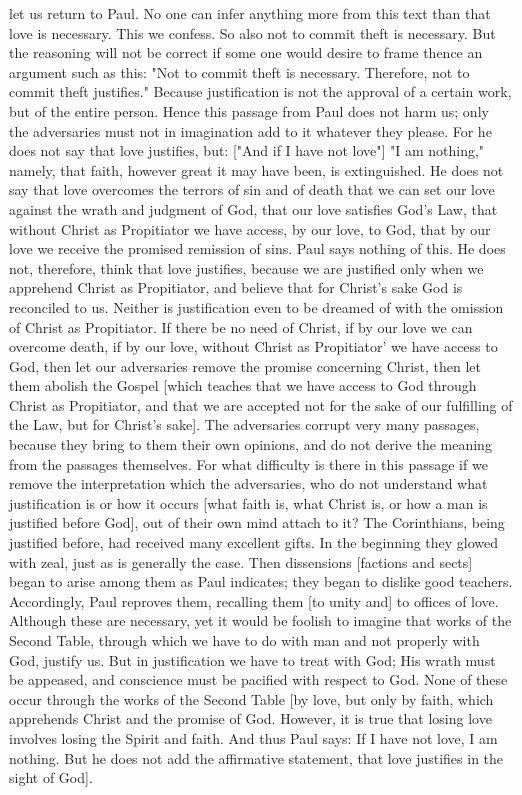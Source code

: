 let us return to Paul.  No one can infer anything more from this text
than that love is necessary.  This we confess.  So also not to commit
theft is necessary.  But the reasoning will not be correct if some
one would desire to frame thence an argument such as this: "Not to
commit theft is necessary.  Therefore, not to commit theft justifies."
Because justification is not the approval of a certain work, but of
the entire person.  Hence this passage from Paul does not harm us;
only the adversaries must not in imagination add to it whatever they
please.  For he does not say that love justifies, but: ["And if I
have not love"] "I am nothing," namely, that faith, however great it
may have been, is extinguished.  He does not say that love overcomes
the terrors of sin and of death that we can set our love against the
wrath and judgment of God, that our love satisfies God's Law, that
without Christ as Propitiator we have access, by our love, to God,
that by our love we receive the promised remission of sins.  Paul
says nothing of this.  He does not, therefore, think that love
justifies, because we are justified only when we apprehend Christ as
Propitiator, and believe that for Christ's sake God is reconciled to
us.  Neither is justification even to be dreamed of with the omission
of Christ as Propitiator.  If there be no need of Christ, if by our
love we can overcome death, if by our love, without Christ as
Propitiator' we have access to God, then let our adversaries remove
the promise concerning Christ, then let them abolish the Gospel
[which teaches that we have access to God through Christ as
Propitiator, and that we are accepted not for the sake of our
fulfilling of the Law, but for Christ's sake].  The adversaries
corrupt very many passages, because they bring to them their own
opinions, and do not derive the meaning from the passages themselves.
For what difficulty is there in this passage if we remove the
interpretation which the adversaries, who do not understand what
justification is or how it occurs [what faith is, what Christ is, or
how a man is justified before God], out of their own mind attach to
it?  The Corinthians, being justified before, had received many
excellent gifts.  In the beginning they glowed with zeal, just as is
generally the case.  Then dissensions [factions and sects] began to
arise among them as Paul indicates; they began to dislike good
teachers.  Accordingly, Paul reproves them, recalling them [to unity
and] to offices of love.  Although these are necessary, yet it would
be foolish to imagine that works of the Second Table, through which
we have to do with man and not properly with God, justify us.  But in
justification we have to treat with God; His wrath must be appeased,
and conscience must be pacified with respect to God.  None of these
occur through the works of the Second Table [by love, but only by
faith, which apprehends Christ and the promise of God.  However, it
is true that losing love involves losing the Spirit and faith.  And
thus Paul says: If I have not love, I am nothing.  But he does not
add the affirmative statement, that love justifies in the sight of
God].

